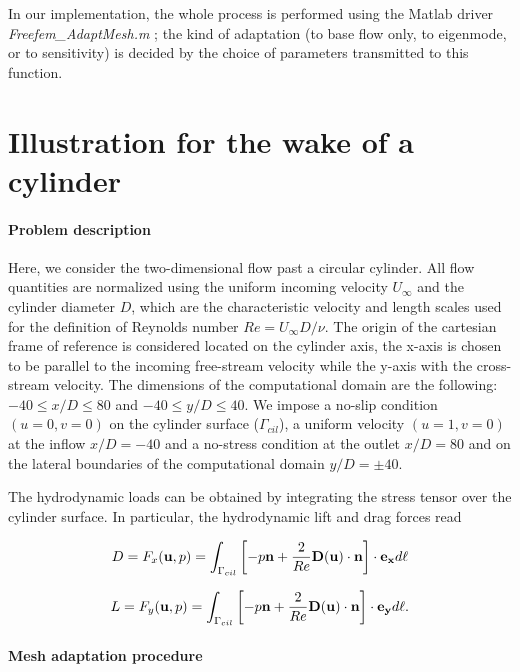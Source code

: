 \documentclass[twocolumn,10pt]{asme2ej}
\newcommand{\be}[1]{ \begin{equation} \label{#1}}
\newcommand{\ee}{\end{equation}}
\begin{document}
In our implementation, the whole process is performed using the Matlab driver {\em Freefem\_AdaptMesh.m} ; the kind of adaptation  (to base flow only, to eigenmode, or to sensitivity) is decided by the choice of parameters transmitted to this function.






\section{Illustration for the wake of a cylinder} 
\vspace{.2cm}

\paragraph{Problem description}
Here, we consider the two-dimensional flow past a circular cylinder. All flow quantities are normalized using 
the uniform incoming velocity $U_{\infty}$ and the cylinder diameter $D$, which are the characteristic velocity and 
length scales used for the definition of Reynolds number $Re= U_{\infty} D / \nu$.
The origin of the cartesian frame of reference is considered located on the cylinder axis, the x-axis is chosen to be parallel to the incoming free-stream velocity while the y-axis with the cross-stream velocity.
The dimensions of the computational domain are the following: $-40 \le x/D \le 80$ and $-40 \le y/D \le 40$.
We impose a no-slip condition $(u=0,v=0)$ on the cylinder surface (${\Gamma_{cil}}$), a uniform velocity $(u=1,v=0)$ at the inflow 
$x/D=-40$ and a no-stress condition at the outlet $x/D=80$ and on the lateral boundaries of the computational domain $y/D=\pm 40$.

The hydrodynamic loads can be obtained by integrating the stress tensor over the cylinder surface.
In particular, the hydrodynamic lift and drag forces read 

\be{drag}
D = F_x ({\bf u},p) = 
 \int_{\Gamma_{cil}} \left[-p {\bf n} + \frac{2}{Re} {\bf D}({\bf u}) \cdot {\bf n} \right]   \cdot {\bf e_x} d\ell
\ee


\be{lift}
L = F_y ({\bf u},p) = 
 \int_{\Gamma_{cil}} \left[-p {\bf n} + \frac{2}{Re} {\bf D}({\bf u}) \cdot {\bf n} \right]   \cdot {\bf e_y} d\ell. 
\ee



\paragraph{Mesh adaptation procedure}
\end{document}
